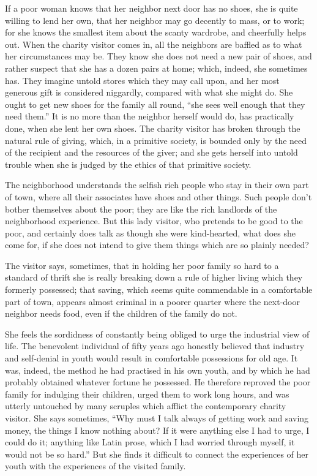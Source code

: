 \documentclass[]{article}
\begin{document}
\begin{sectionbody}
\addamsparagraph If a poor woman knows that her neighbor next door has no shoes, she is
quite willing to lend her own, that her neighbor may go decently to
mass, or to work; for she knows the smallest item about the scanty
wardrobe, and cheerfully helps out. When the charity visitor comes in,
all the neighbors are baffled as to what her circumstances may be. They
know she does not need a new pair of shoes, and rather suspect that she
has a dozen pairs at home; which, indeed, she sometimes has. They
imagine untold stores which they may call upon, and her most generous
gift is considered niggardly, compared with what she might do. She ought
to get new shoes for the family all round, ``she sees well enough that
they need them.'' It is no more than the neighbor herself would do, has
practically done, when she lent her own shoes. The charity visitor has
broken through the natural rule of giving, which, in a primitive
society, is bounded only by the need of the recipient and the resources
of the giver; and she gets herself into untold trouble when she is
judged by the ethics of that primitive society.

\addamsparagraph The neighborhood understands the selfish rich people who stay in their
own part of town, where all their associates have shoes and other
things. Such people don't bother themselves about the poor; they are
like the rich landlords of the neighborhood experience. But this lady
visitor, who pretends to be good to the poor, and certainly does talk as
though she were kind-hearted, what does she come for, if she does not
intend to give them things which are so plainly needed?

\addamsparagraph The visitor says, sometimes, that in holding her poor family so hard to
a standard of thrift she is really breaking down a rule of higher living
which they formerly possessed; that saving, which seems quite
commendable in a comfortable part of town, appears almost criminal in a
poorer quarter where the next-door neighbor needs food, even if the
children of the family do not.

\addamsparagraph She feels the sordidness of constantly being obliged to urge the
industrial view of life. The benevolent individual of fifty years ago
honestly believed that industry and self-denial in youth would result in
comfortable possessions for old age. It was, indeed, the method he had
practised in his own youth, and by which he had probably obtained
whatever fortune he possessed. He therefore reproved the poor family for
indulging their children, urged them to work long hours, and was utterly
untouched by many scruples which afflict the contemporary charity
visitor. She says sometimes, ``Why must I talk always of getting work and
saving money, the things I know nothing about? If it were anything else
I had to urge, I could do it; anything like Latin prose, which I had
worried through myself, it would not be so hard.'' But she finds it
difficult to connect the experiences of her youth with the experiences
of the visited family.


\end{sectionbody}
\end{document}
